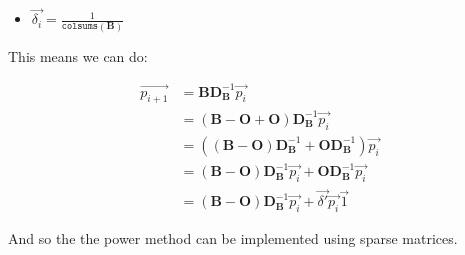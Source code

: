 \documentclass[11pt]{article}
\begin{document}
\begin{itemize}
\item \(\vec{\delta_i} = \frac{1}{\mathtt{colsums} \left( \mathbf{B} \right)}\)
\end{itemize}

This means we can do:

$$\begin{aligned}
     \vec{p_{i +  1}} &=  \mathbf{B} \mathbf{D}_{\mathbf{B}}^{- 1} \vec{p_{i}}  \\
     &= \left( \mathbf{B} -  \mathbf{O} +  \mathbf{O} \right) \mathbf{D}_{\mathbf{B}}^{- 1}\vec{p_i} \\
     &= \left( \left( \mathbf{B} -  \mathbf{O} \right) \mathbf{D}_{\mathbf{B}}^{- 1} +  \mathbf{O}\mathbf{D}_{\mathbf{B}}^{- 1} \right) \vec{p_i} \\
     &= \left( \mathbf{B}-  \mathbf{O}\right) \mathbf{D}_{\mathbf{B}}^{- 1} \vec{p_i} +  \mathbf{O} \mathbf{D}_{\mathbf{B}}^{- 1} \vec{p_i}  \\
     &= \left( \mathbf{B}- \mathbf{O} \right)\mathbf{D}_{\mathbf{B}}^{- 1} \vec{p_i} +  \vec{\delta'}\vec{p_i} \vec{1}
 \end{aligned}$$

And so the the power method can be implemented using sparse matrices.
\end{document}

